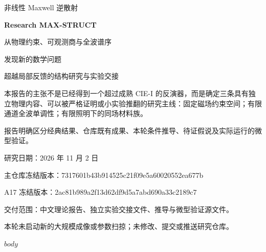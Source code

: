 \documentclass[11pt,a4paper]{article}
\begin{document}
\begin{titlepage}
\vspace*{14mm}
{\Large 非线性 Maxwell 逆散射}\par
\vspace{8mm}
{\Huge\bfseries Research MAX-STRUCT}\par
\vspace{8mm}
{\LARGE 从物理约束、可观测商与全波谱序\par 发现新的数学问题}\par
\vspace{12mm}
{\large 超越局部反馈的结构研究与实验交接}\par
\vspace{14mm}
\begin{minipage}{.92\textwidth}
本报告的主张不是已经得到一个超过成熟 CIE-I 的反演器，而是确定三条具有独立物理内容、可以被严格证明或小实验推翻的研究主线：固定磁场约束空间；有限通道全波单调性；有限照明下的同场材料族。\par
报告明确区分经典结果、仓库既有成果、本轮条件推导、待证假说及实际运行的微型验证。
\end{minipage}
\vfill
{\large 研究日期：2026 年 11 月 2 日}\par
\vspace{3mm}
{\small 主仓库冻结版本：7317601b43b914525c21f09e5a60020552ea677b}\par
{\small A17 冻结版本：2ac81b989a2f13d62df9d5a7abd690a33c2189c7}\par
\vspace{7mm}
{\small 交付范围：中文理论报告、独立实验交接文件、推导与微型验证源文件。\par
本轮未启动新的大规模成像或参数扫掠；未修改、提交或推送研究仓库。}
\end{titlepage}
\tableofcontents
\clearpage
$body$
\end{document}
